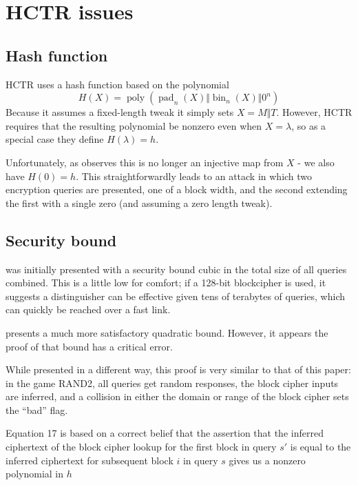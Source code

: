 \documentclass[letterpaper,11pt]{article}
\newcommand*{\Concat}{\Vert}
\DeclareMathOperator{\fromint}{bin}
\DeclareMathOperator{\pad}{pad}
\DeclareMathOperator{\poly}{poly}
\begin{document}
\section{HCTR issues}\label{hctrflaws}
\subsection{Hash function}
HCTR uses a hash function based on the polynomial
\begin{displaymath}
    H(X) = \poly(\pad_n(X) \Concat \fromint_{n}(X) \Concat 0^n)
\end{displaymath}
Because it assumes a fixed-length tweak it simply sets \(X = M \Concat T\).
However, HCTR requires that the resulting polynomial be nonzero
even when \(X = \lambda\), so as a special case they define
\(H(\lambda) = h\).

Unfortunately, as \cite{kumarhctr} observes this is no longer
an injective map from \(X\) - we also have \(H(0) = h\). This
straightforwardly leads to an attack in which two encryption queries
are presented, one of a block width, and the second extending
the first with a single zero (and assuming a zero length tweak).

\subsection{Security bound}
\cite{hctr} was initially presented with a security bound cubic
in the total size of all queries combined.  This is a little low
for comfort; if a 128-bit blockcipher is used, it suggests a
distinguisher can be effective given tens of terabytes of queries,
which can quickly be reached over a fast link. 

\cite{hctrquad} presents a much more satisfactory quadratic bound.
However, it appears the proof of that bound has a critical error.

While presented in a different way, this proof is very similar
to that of this paper: in the game RAND2, all queries get random
responses, the block cipher inputs are inferred, and a collision
in either the domain or range of the block cipher
sets the ``bad'' flag.



Equation 17 is based on a correct belief that the assertion that
the inferred ciphertext
of the block cipher lookup for the first block in query \(s'\) is
equal to the inferred ciphertext for subsequent block \(i\) in
query \(s\)
gives us a nonzero polynomial in \(h\)
\end{document}
